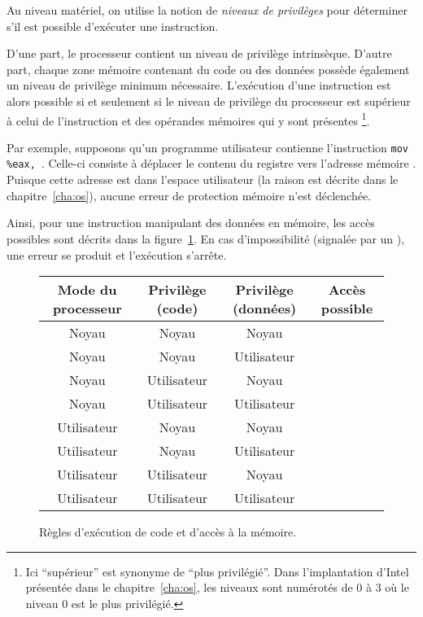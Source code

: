 Au niveau matériel, on utilise la notion de \emph{niveaux de privilèges} pour
déterminer s'il est possible d'exécuter une instruction.

D'une part, le processeur contient un niveau de privilège intrinsèque. D'autre
part, chaque zone mémoire contenant du code ou des données possède également un
niveau de privilège minimum nécessaire. L'exécution d'une instruction est alors
possible si et seulement si le niveau de privilège du processeur est supérieur à
celui de l'instruction et des opérandes mémoires qui y sont présentes
\footnote{
  Ici ``supérieur'' est synonyme de ``plus privilégié''. Dans l'implantation
  d'Intel présentée dans le chapitre~\ref{cha:os}, les niveaux sont numérotés de
  0 à 3 où le niveau 0 est le plus privilégié.
}.

Par exemple, supposons qu'un programme utilisateur contienne l'instruction
\texttt{mov \%eax, }. Celle-ci consiste à déplacer le contenu du
registre \eax{} vers l'adresse mémoire \texttt{}. Puisque cette
adresse est dans l'espace utilisateur (la raison est décrite dans le
chapitre~\ref{cha:os}), aucune erreur de protection mémoire n'est déclenchée.

Ainsi, pour une instruction manipulant des données en mémoire, les accès
possibles sont décrits dans la figure~\ref{fig:erreursec}. En cas
d'impossibilité (signalée par un \Square), une erreur se produit et l'exécution
s'arrête.

\begin{figure}
\begin{center}
\def\modeK{Noyau\xspace}
\def\modeU{Utilisateur\xspace}
\begin{tabular}{cccc}
  Mode du processeur
& Privilège (code)
& Privilège (données)
& Accès possible \\
\midrule
  \modeK{} & \modeK{} & \modeK{} & \CheckedBox{} \\
  \modeK{} & \modeK{} & \modeU{} & \CheckedBox{} \\
  \modeK{} & \modeU{} & \modeK{} & \CheckedBox{} \\
  \modeK{} & \modeU{} & \modeU{} & \CheckedBox{} \\
  \modeU{} & \modeK{} & \modeK{} & \Square{} \\
  \modeU{} & \modeK{} & \modeU{} & \Square{} \\
  \modeU{} & \modeU{} & \modeK{} & \Square{} \\
  \modeU{} & \modeU{} & \modeU{} & \CheckedBox{} \\
\end{tabular}
\end{center}

\caption{ Règles d'exécution de code et d'accès à la mémoire. }
\label{fig:erreursec}

\end{figure}

